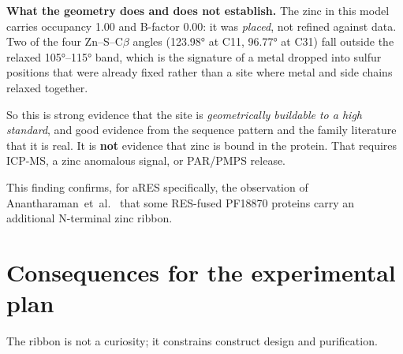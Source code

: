 \documentclass[11pt,a4paper]{article}
\begin{document}
\begin{caveat}
\textbf{What the geometry does and does not establish.} The zinc in this model
carries occupancy 1.00 and B-factor 0.00: it was \emph{placed}, not refined
against data. Two of the four Zn--S--C$\beta$ angles (\ang{123.98} at C11,
\ang{96.77} at C31) fall outside the relaxed \ang{105}--\ang{115} band, which is
the signature of a metal dropped into sulfur positions that were already fixed
rather than a site where metal and side chains relaxed together.

So this is strong evidence that the site is \emph{geometrically buildable to a
high standard}, and good evidence from the sequence pattern and the family
literature that it is real. It is \textbf{not} evidence that zinc is bound in the
protein. That requires ICP-MS, a zinc anomalous signal, or PAR/PMPS release.
\end{caveat}

This finding confirms, for aRES specifically, the observation of
Anantharaman~et~al.~\cite{anantharaman2013} that some RES-fused PF18870 proteins
carry an additional N-terminal zinc ribbon.

\section{Consequences for the experimental plan}
\label{sec:consequences}

The ribbon is not a curiosity; it constrains construct design and purification.
\end{document}
